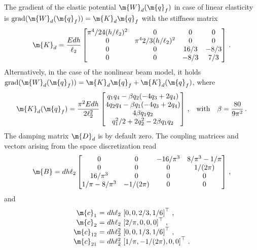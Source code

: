 The gradient of the elastic potential $\m{W}_{d}(\m{q}_{f}^{\phantom{\prime}})$ in case of linear elasticity is $\mathrm{grad}(\m{W}_{d}(\m{q}_{f}^{\phantom{\prime}})) = \m{K}_{d} \m{q}_{f}^{\phantom{\prime}}$ with the stiffness matrix
%
\begin{equation*}
  \m{K}_{d} = \dfrac{E d h}{\ell_2} \begin{bmatrix}
    \pi^4/24(h/\ell_2)^2 & 0                    & 0    & 0    \\
    0                   & \pi^4 2/3(h/\ell_2)^2 & 0    & 0    \\
    0                   & 0                     & 16/3 & -8/3 \\
    0                   & 0                     & -8/3 & 7/3
  \end{bmatrix} \, \text{.}
\end{equation*}
%
Alternatively, in the case of the nonlinear beam model, it holds $\mathrm{grad}(\m{W}_{d}(\m{q}_{f}^{\phantom{\prime}})) = \m{K}_{d}\m{q}_{f}^{\phantom{\prime}} + \m{K}_{d}(\m{q}_{f}^{\phantom{\prime}})$, where
%
\begin{equation*}
  \m{K}_{d}(\m{q}_{f}^{\phantom{\prime}}) = \dfrac{\pi^2 E d h}{2\ell_2^2} \begin{bmatrix}
    q_1 q_4 - \beta q_2(-4q_3 + 2q_4) \\
    4 q_2 q_4 - \beta q_1(-4q_3 + 2q_4) \\
    4 \beta q_1 q_2 \\
    q_1^2/2 + 2q_2^2 - 2 \beta q_1 q_2
  \end{bmatrix} \, \text{,}
  \quad \text{with} \quad
  \beta = \dfrac{80}{9\pi^2} \, \text{.}
\end{equation*}
%
The damping matrix $\m{D}_{d}$ is by default zero. The coupling matrices and vectors arising from the space discretization read
%
\begin{equation*}
  \m{B} = d h \ell_2 \begin{bmatrix}
    0             & 0         & -16/\pi^3 & 8/\pi^3-1/\pi \\
    0             & 0         & 0         & 1/(2\pi)      \\
    16/\pi^3      & 0         & 0         & 0             \\
    1/\pi-8/\pi^3 & -1/(2\pi) & 0         & 0
  \end{bmatrix} \, \text{,}
\end{equation*}
%
and
%
\begin{equation*}
  \begin{array}{r@{~}c@{~}l}
    \m{c}_{1}  &=& d h \ell_2  \, \left[ 0,     0,         2/3, 1/6 \right]^\top \, \text{,} \\
    \m{c}_{2}  &=& d h \ell_2  \, \left[ 2/\pi, 0,         0,   0   \right]^\top \, \text{,} \\
    \m{c}_{12} &=& d h \ell_2^2\, \left[ 0,     0,         1/3, 1/6 \right]^\top \, \text{,} \\
    \m{c}_{21} &=& d h \ell_2^2\, \left[ 1/\pi, -1/(2\pi), 0,   0   \right]^\top \, \text{.}
  \end{array}
\end{equation*}
